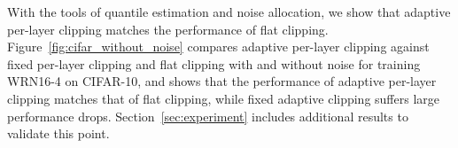     
    











With the tools of quantile estimation and noise allocation, we show that adaptive per-layer clipping matches the performance of flat clipping. 
Figure~\ref{fig:cifar_without_noise} compares adaptive per-layer clipping against fixed per-layer clipping and flat clipping with and without noise for training WRN16-4 on CIFAR-10, and
shows that the performance of adaptive per-layer clipping matches that of flat clipping, while fixed adaptive clipping suffers large performance drops.
Section~\ref{sec:experiment} includes additional results to validate this point.



